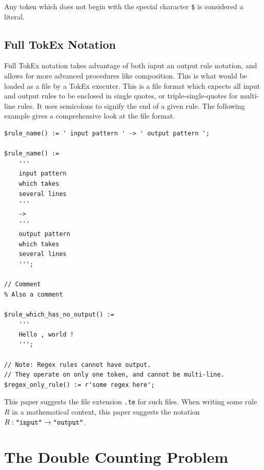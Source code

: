 \documentclass[8pt]{amsart}
\begin{document}
    Any token which does not begin with the special character
    \verb|$| is considered a literal.

    \subsection{Full TokEx Notation}

    Full TokEx notation takes advantage of both input an output
    rule notation, and allows for more advanced procedures like
    composition. This is what would be loaded as a file by a
    TokEx executer. This is a file format which expects all
    input and output rules to be enclosed in single quotes, or
    triple-single-quotes for multi-line rules. It uses
    semicolons to signify the end of a given rule. The following
    example gives a comprehensive look at the file format.

\begin{verbatim}
$rule_name() := ' input pattern ' -> ' output pattern ';

$rule_name() :=
    '''
    input pattern
    which takes
    several lines
    '''
    ->
    '''
    output pattern
    which takes
    several lines
    ''';

// Comment
% Also a comment

$rule_which_has_no_output() :=
    '''
    Hello , world !
    ''';

// Note: Regex rules cannot have output.
// They operate on only one token, and cannot be multi-line.
$regex_only_rule() := r'some regex here';

\end{verbatim}

    This paper suggests the file extension \verb|.te| for such
    files. When writing some rule $R$ in a mathematical context,
    this paper suggests the notation
    $R : \verb|"input"| \to \verb|"output"|$.

\section{The Double Counting Problem}
\end{document}
